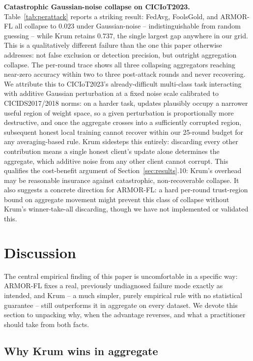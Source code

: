 \documentclass[pdflatex,iicol,sn-mathphys-num]{sn-jnl}%
\theoremstyle{thmstyleone}%
\theoremstyle{thmstyletwo}%
\theoremstyle{thmstylethree}%
\begin{document}
\textbf{Catastrophic Gaussian-noise collapse on CICIoT2023.}\label{sec:case2} Table~\ref{tab:perattack} reports a striking result: FedAvg, FoolsGold, and ARMOR-FL all collapse to $0.023$ under Gaussian-noise -- indistinguishable from random guessing -- while Krum retains $0.737$, the single largest gap anywhere in our grid. This is a qualitatively different failure than the one this paper otherwise addresses: not false exclusion or detection precision, but outright aggregation collapse. The per-round trace shows all three collapsing aggregators reaching near-zero accuracy within two to three post-attack rounds and never recovering. We attribute this to CICIoT2023's already-difficult multi-class task interacting with additive Gaussian perturbation at a fixed noise scale calibrated to CICIDS2017/2018 norms: on a harder task, updates plausibly occupy a narrower useful region of weight space, so a given perturbation is proportionally more destructive, and once the aggregate crosses into a sufficiently corrupted region, subsequent honest local training cannot recover within our 25-round budget for any averaging-based rule. Krum sidesteps this entirely: discarding every other contribution means a single honest client's update alone determines the aggregate, which additive noise from any other client cannot corrupt. This qualifies the cost-benefit argument of Section~\ref{sec:results}.10: Krum's overhead may be reasonable insurance against catastrophic, non-recoverable collapse. It also suggests a concrete direction for ARMOR-FL: a hard per-round trust-region bound on aggregate movement might prevent this class of collapse without Krum's winner-take-all discarding, though we have not implemented or validated this.

\section{Discussion}\label{sec:discussion}

The central empirical finding of this paper is uncomfortable in a specific way: ARMOR-FL fixes a real, previously undiagnosed failure mode exactly as intended, and Krum -- a much simpler, purely empirical rule with no statistical guarantee -- still outperforms it in aggregate on every dataset. We devote this section to unpacking why, when the advantage reverses, and what a practitioner should take from both facts.

\subsection{Why Krum wins in aggregate}\label{sec:whykrum}
\end{document}
